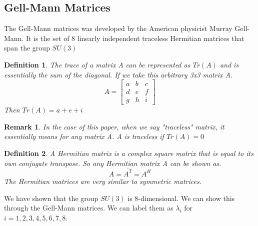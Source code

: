 \documentclass[12pt]{article}
\newtheorem{definition}{Definition}
\newtheorem*{rem}{Remark}
\begin{document}
\subsection{Gell-Mann Matrices}
The Gell-Mann matrices was developed by the American physicist Murray Gell-Mann. It is the set of 8 linearly independent traceless Hermitian matrices that span the group $SU(3)$\\
\begin{definition}
The trace of a matrix A can be represented as $Tr(A)$ and is essentially the sum of the diagonal. If we take this arbitrary 3x3 matrix A.
\[A = 
	\left[ \begin{matrix}
	a & b & c\\
	d & e & f\\
	g & h & i
	\end{matrix} \right]
\]
Then $Tr(A) = a + e + i$
\end{definition}
\begin{rem}
In the case of this paper, when we say "traceless" matrix, it essentially means for any matrix A. A is traceless if $Tr(A) = 0$
\end{rem}
\begin{definition}
A Hermitian matrix is a complex square matrix that is equal to its own conjugate transpose. So any Hermitian matrix A can be shown as.
\[ A = \overline{A^T} = A^H\]
The Hermitian matrices are very similar to symmetric matrices.
\end{definition}
We have shown that the group $SU(3)$ is 8-dimensional. We can show this through the Gell-Mann matrices. We can label them as $\lambda_i$ for $i = 1,2,3,4,5,6,7,8$.\\
\end{document}
